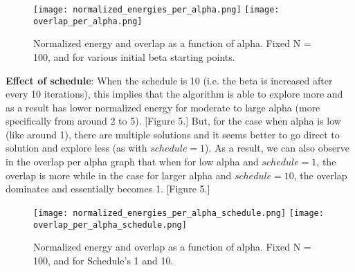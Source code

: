 \documentclass[a4paper]{article}
\begin{document}
\begin{figure}[H]
    \centering
    {{\texttt{[image: normalized\_energies\_per\_alpha.png]} }}%
    \qquad
    {{\texttt{[image: overlap\_per\_alpha.png]} }}%
    \caption{Normalized energy and overlap as a function of alpha. Fixed N = 100, and for various initial beta starting points.}%
    \label{fig:example}%
\end{figure}

\textbf{Effect of schedule}: When the schedule is 10 (i.e. the beta is increased after every 10 iterations), this implies that the algorithm is able to explore more and as a result has lower normalized energy for moderate to large alpha (more specifically from around 2 to 5). [Figure 5.] But, for the case when alpha is low (like around 1), there are multiple solutions and it seems better to go direct to solution and explore less (as with $schedule = 1$). As a result, we can also observe in the overlap per alpha graph that when for low alpha and $schedule = 1 $, the overlap is more while in the case for larger alpha and $schedule = 10$, the overlap dominates and essentially becomes 1. [Figure 5.] \\

\begin{figure}[H]
    \centering
    {{\texttt{[image: normalized\_energies\_per\_alpha\_schedule.png]} }}%
    \qquad
    {{\texttt{[image: overlap\_per\_alpha\_schedule.png]} }}%
    \caption{Normalized energy and overlap as a function of alpha. Fixed N = 100, and for Schedule's 1 and 10.}%
    \label{fig:example}%
\end{figure}
\end{document}
